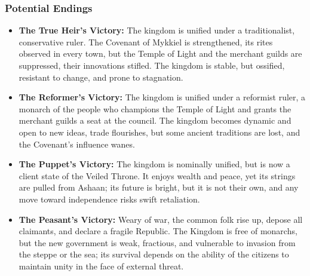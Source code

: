 \documentclass[11pt]{article}
\begin{document}
\subsubsection{Potential Endings}
\begin{itemize}
    \item \textbf{The True Heir's Victory:} The kingdom is unified under a traditionalist, conservative ruler. The Covenant of Mykkiel is strengthened, its rites observed in every town, but the Temple of Light and the merchant guilds are suppressed, their innovations stifled. The kingdom is stable, but ossified, resistant to change, and prone to stagnation.
    \item \textbf{The Reformer's Victory:} The kingdom is unified under a reformist ruler, a monarch of the people who champions the Temple of Light and grants the merchant guilds a seat at the council. The kingdom becomes dynamic and open to new ideas, trade flourishes, but some ancient traditions are lost, and the Covenant's influence wanes.
    \item \textbf{The Puppet's Victory:} The kingdom is nominally unified, but is now a client state of the Veiled Throne. It enjoys wealth and peace, yet its strings are pulled from Ashaan; its future is bright, but it is not their own, and any move toward independence risks swift retaliation.
    \item \textbf{The Peasant's Victory:} Weary of war, the common folk rise up, depose all claimants, and declare a fragile Republic. The Kingdom is free of monarchs, but the new government is weak, fractious, and vulnerable to invasion from the steppe or the sea; its survival depends on the ability of the citizens to maintain unity in the face of external threat.
\end{itemize}
\end{document}
